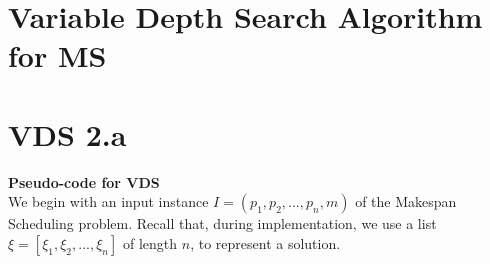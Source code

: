 \documentclass[12pt,a4paper,reqno]{article}
\begin{document}
\newpage













\section{Variable Depth Search Algorithm for MS}

\section*{VDS 2.a}
\textbf{Pseudo-code for VDS}\\
We begin with an input instance $I = (p_1,p_2,...,p_n,m)$ of the Makespan Scheduling problem. Recall that, during implementation, we use a list $\xi = [\xi_1,\xi_2,...,\xi_n]$ of length $n$, to represent a solution.
\end{document}
